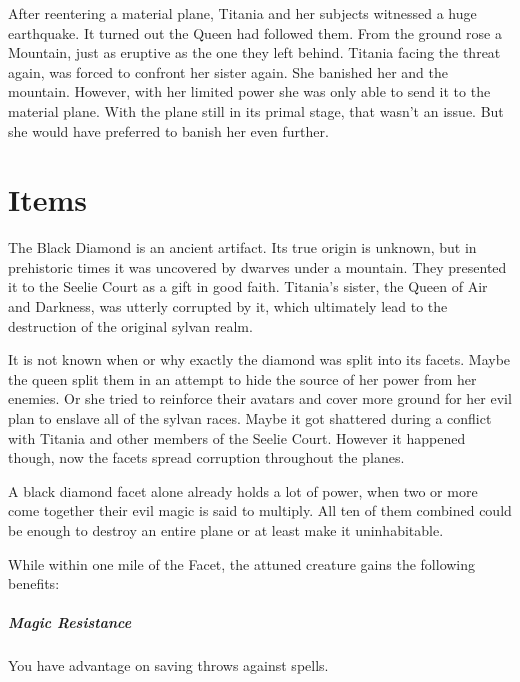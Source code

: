 \documentclass[letter,10pt,twocolumn,openany]{dndbook}
\begin{document}
\begin{DndComment}
  After reentering a material plane, Titania and her subjects witnessed a huge earthquake.
  It turned out the Queen had followed them.
  From the ground rose a Mountain, just as eruptive as the one they left behind.
  Titania facing the threat again, was forced to confront her sister again.
  She banished her and the mountain.
  However, with her limited power she was only able to send it to the material plane.
  With the plane still in its primal stage, that wasn't an issue.
  But she would have preferred to banish her even further.
\end{DndComment}

\chapter{Items}


The Black Diamond is an ancient artifact.
Its true origin is unknown, but in prehistoric times it was uncovered by dwarves under a mountain.
They presented it to the Seelie Court as a gift in good faith.
Titania's sister, the Queen of Air and Darkness, was utterly corrupted by it,
which ultimately lead to the destruction of the original sylvan realm.

It is not known when or why exactly the diamond was split into its facets.
Maybe the queen split them in an attempt to hide the source of her power from her enemies.
Or she tried to reinforce their avatars and cover more ground for her evil plan to enslave all of the sylvan races.
Maybe it got shattered during a conflict with Titania and other members of the Seelie Court.
However it happened though, now the facets spread corruption throughout the planes.

A black diamond facet alone already holds a lot of power,
when two or more come together their evil magic is said to multiply.
All ten of them combined could be enough to destroy an entire plane or at least make it uninhabitable.

While within one mile of the Facet, the attuned creature gains the following benefits:

\paragraph{Magic Resistance}
You have advantage on saving throws against spells.
\end{document}
